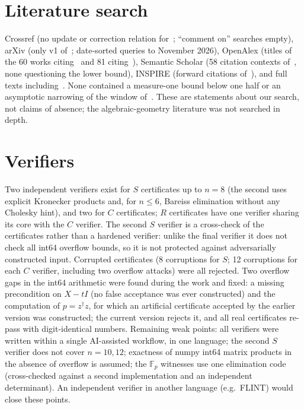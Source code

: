 \documentclass[aps,pra,onecolumn,superscriptaddress,nofootinbib,longbibliography,10pt]{revtex4-2}
\theoremstyle{definition}
\newcommand{\FF}{\mathbb F}
\begin{document}
\appendix
\section{Literature search}\label{app:search}
Crossref (no update or correction relation for~\cite{JL05}; ``comment on'' searches empty), arXiv (only v1 of~\cite{JL05}; date-sorted queries to November 2026), OpenAlex (titles of the 60 works citing~\cite{JL05} and 81 citing~\cite{LW02}), Semantic Scholar (58 citation contexts of~\cite{JL05}, none questioning the lower bound), INSPIRE (forward citations of~\cite{SC23,JL05,HG16,KJTV19,WHG17,ZSZ24}), and full texts including~\cite{Wyd20,Hub17,CDJJKSZ13,YSCZ26}. None contained a measure-one bound below one half or an asymptotic narrowing of the window of~\cite{LW02}. These are statements about our search, not claims of absence; the algebraic-geometry literature was not searched in depth.


\section{Verifiers}\label{app:ver}
Two independent verifiers exist for $S$ certificates up to $n=8$ (the second uses explicit Kronecker products and, for $n\le6$, Bareiss elimination without any Cholesky hint), and two for $C$ certificates; $R$ certificates have one verifier sharing its core with the $C$ verifier. The second $S$ verifier is a cross-check of the certificates rather than a hardened verifier: unlike the final verifier it does not check all int64 overflow bounds, so it is not protected against adversarially constructed input. Corrupted certificates (8 corruptions for $S$; 12 corruptions for each $C$ verifier, including two overflow attacks) were all rejected. Two overflow gaps in the int64 arithmetic were found during the work and fixed: a missing precondition on $X-tI$ (no false acceptance was ever constructed) and the computation of $p=z^\dagger z$, for which an artificial certificate accepted by the earlier version was constructed; the current version rejects it, and all real certificates re-pass with digit-identical numbers. Remaining weak points: all verifiers were written within a single AI-assisted workflow, in one language; the second $S$ verifier does not cover $n=10,12$; exactness of numpy int64 matrix products in the absence of overflow is assumed; the $\FF_p$ witnesses use one elimination code (cross-checked against a second implementation and an independent determinant). An independent verifier in another language (e.g.\ FLINT) would close these points.
\end{document}
